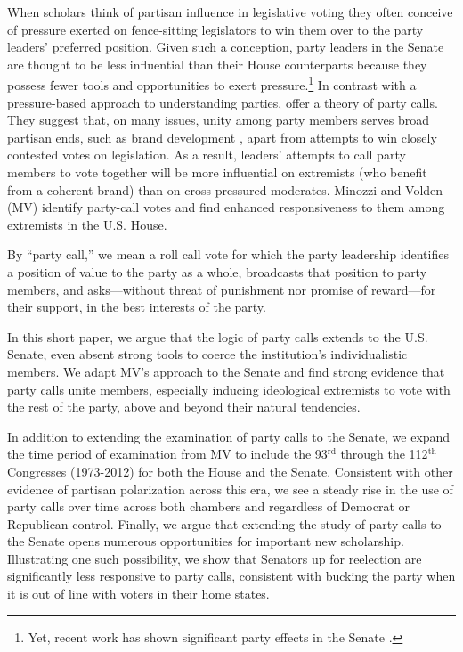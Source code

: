 \documentclass[12pt]{article}
\begin{document}
\noindent When scholars think of partisan influence in legislative voting they often conceive of pressure exerted on fence-sitting legislators to win them over to the party leaders' preferred position.  Given such a conception, party leaders in the Senate are thought to be less influential than their House counterparts because they possess fewer tools and opportunities to exert pressure.\footnote{\doublespacing\normalsize Yet, recent work has shown significant party effects in the Senate \citep[e.g.,][]{Gailmard:2007, Monroe:2008, Patty:2008, Volden:2006}.}  In contrast with a pressure-based approach to understanding parties, \cite{Minozzi:2013} offer a theory of party calls.  They suggest that, on many issues, unity among party members serves broad partisan ends, such as brand development \citep[e.g.,][]{Snyder:2002}, apart from attempts to win closely contested votes on legislation.  As a result, leaders' attempts to call party members to vote together will be more influential on extremists (who benefit from a coherent brand) than on cross-pressured moderates.  Minozzi and Volden (MV) identify party-call votes and find enhanced responsiveness to them among extremists in the U.S. House.

By ``party call,'' we mean a roll call vote for
which the party leadership identifies a position of value to the party as a
whole, broadcasts that position to party members, and
asks---without threat of punishment nor promise of reward---for
their support, in the best interests of the party.

In this short paper, we argue that the logic of party calls extends to the U.S. Senate, even absent strong tools to coerce the institution's individualistic members.  We adapt MV's approach to the Senate and find strong evidence that party calls unite members, especially inducing ideological extremists to vote with the rest of the party, above and beyond their natural tendencies.

In addition to extending the examination of party calls to the Senate, we expand the time period of examination from MV to include the 93$^{\text{rd}}$ through the 112$^{\text{th}}$ Congresses (1973-2012) for both the House and the Senate. Consistent with other evidence of partisan polarization across this era, we see a steady rise in the use of party calls over time across both chambers and regardless of Democrat or Republican control. Finally, we argue that extending the study of party calls to the Senate opens numerous opportunities for important new scholarship.  Illustrating one such possibility, we show that Senators up for reelection are significantly less responsive to party calls, consistent with bucking the party when it is out of line with voters in their home states.
\end{document}

